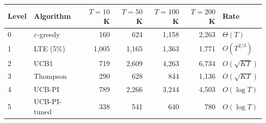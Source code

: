 \begin{tabular}{llrrrrl}
\toprule
Level & Algorithm & $T{=}10$K & $T{=}50$K & $T{=}100$K & $T{=}200$K & Rate \\
\midrule
0 & $\varepsilon$-greedy & 160 & 624 & 1,158 & 2,263 & $\Theta(T)$ \\
1 & LTE (5\%) & 1,005 & 1,165 & 1,363 & 1,771 & $O(T^{2/3})$ \\
2 & UCB1 & 719 & 2,609 & 4,263 & 6,734 & $O(\sqrt{KT})$ \\
3 & Thompson & 290 & 628 & 844 & 1,136 & $O(\sqrt{KT})$ \\
4 & UCB-PI & 789 & 2,266 & 3,244 & 4,503 & $O(\log T)$ \\
5 & UCB-PI-tuned & 338 & 541 & 640 & 780 & $O(\log T)$ \\
\bottomrule
\end{tabular}
